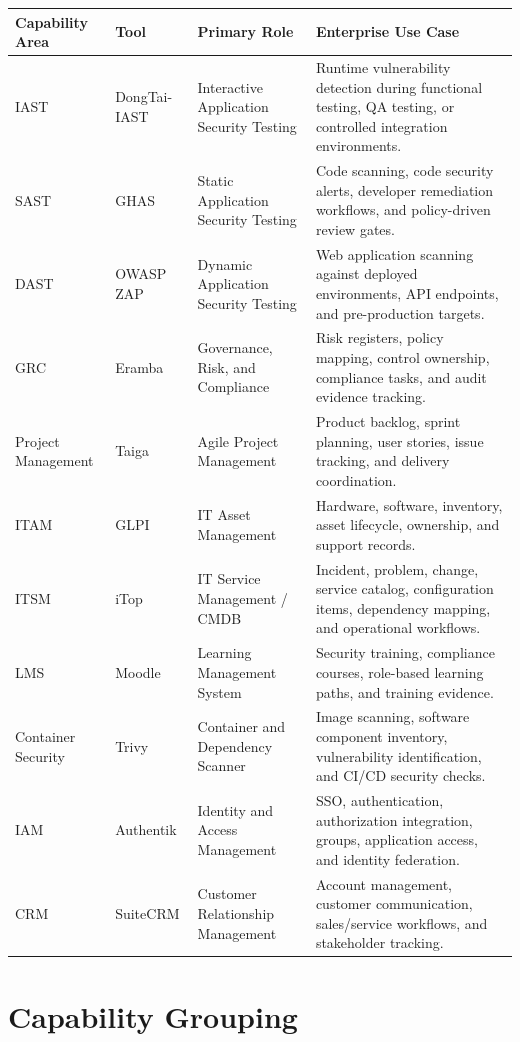 \documentclass[10pt,letterpaper]{article}
\begin{document}
\begin{longtable}{L{1.35in} L{1.05in} L{1.10in} L{3.10in}}
\toprule
\textbf{Capability Area} & \textbf{Tool} & \textbf{Primary Role} & \textbf{Enterprise Use Case} \\
\midrule
IAST & DongTai-IAST & Interactive Application Security Testing & Runtime vulnerability detection during functional testing, QA testing, or controlled integration environments. \\
SAST & GHAS & Static Application Security Testing & Code scanning, code security alerts, developer remediation workflows, and policy-driven review gates. \\
DAST & OWASP ZAP & Dynamic Application Security Testing & Web application scanning against deployed environments, API endpoints, and pre-production targets. \\
GRC & Eramba & Governance, Risk, and Compliance & Risk registers, policy mapping, control ownership, compliance tasks, and audit evidence tracking. \\
Project Management & Taiga & Agile Project Management & Product backlog, sprint planning, user stories, issue tracking, and delivery coordination. \\
ITAM & GLPI & IT Asset Management & Hardware, software, inventory, asset lifecycle, ownership, and support records. \\
ITSM & iTop & IT Service Management / CMDB & Incident, problem, change, service catalog, configuration items, dependency mapping, and operational workflows. \\
LMS & Moodle & Learning Management System & Security training, compliance courses, role-based learning paths, and training evidence. \\
Container Security & Trivy & Container and Dependency Scanner & Image scanning, software component inventory, vulnerability identification, and CI/CD security checks. \\
IAM & Authentik & Identity and Access Management & SSO, authentication, authorization integration, groups, application access, and identity federation. \\
CRM & SuiteCRM & Customer Relationship Management & Account management, customer communication, sales/service workflows, and stakeholder tracking. \\
\bottomrule
\end{longtable}

\section{Capability Grouping}
\end{document}
